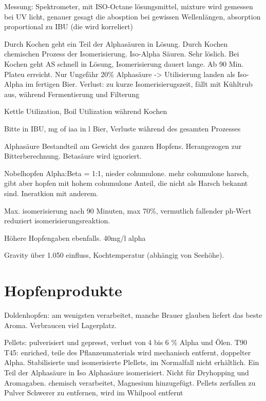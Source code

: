 \documentclass[a4paper,parskip=half]{scrartcl}
\begin{document}
Messung: Spektrometer, mit ISO-Octane lösungsmittel, mixture
wird gemessen bei UV licht, genauer gesagt die abosption
bei gewissen Wellenlängen, absorption proportional
zu IBU (die wird korreliert)

\parencite[12]{Garetz1994}
Durch Kochen geht ein Teil der Alphasäuren in Lösung. Durch Kochen
chemischen Prozess der Isomerisierung. Iso-Alpha Säuren. Sehr löslich.
Bei Kochen geht AS schnell in Lösung, Isomerisierung dauert lange.
Ab 90 Min. Plateu erreicht.
Nur Ungefähr 20\% Alphasäure -> Utilisierung landen als Iso-Alpha im
fertigen Bier.
Verlust: zu kurze Isomerisierugszeit, fällt mit Kühltrub aus,
während Fermentierung und Filterung

\parencite[13]{Garetz1994}
Kettle Utilization, Boil Utilization während Kochen

\parencite[14]{Garetz1994} 
Bitte in IBU, mg of iaa in l Bier, Verluste während des gesamten
Prozesses

\parencite[34]{Garetz1994}
Alphasäure Bestandteil am Gewicht des ganzen Hopfens. Herangezogen
zur Bitterberechnung. Betasäure wird ignoriert.

\parencite[35]{Garetz1994}
Nobelhopfen Alpha:Beta = 1:1, nieder cohumulone.
mehr cohumulone harsch, gibt aber hopfen mit hohem cohumulone
Anteil, die nicht als Harsch bekannt sind. Ineratkion
mit anderem.

\parencite[128]{Garetz1994} 
Max. isomerisierung nach 90 Minuten, max 70\%, vermutlich fallender
ph-Wert reduziert isomerisierungsreaktion.

Höhere Hopfengaben ebenfalls. 40mg/l alpha 

\parencite[129]{Garetz1994} 
Gravity über 1.050 einfluss, Kochtemperatur (abhängig von Seehöhe).



\section{Hopfenprodukte}



\parencite[80\psq]{Garetz1994}
Doldenhopfen: am wenigsten verarbeitet, manche Brauer glauben
liefert das beste Aroma. Verbraucen viel Lagerplatz.

\parencite[82\psqq]{Garetz1994}
Pellets: pulverisiert und gepresst, verlust von 4 bis 6 \% Alpha
und Ölen.
T90
T45: enriched, teile des Pflanzenmaterials wird mechanisch
entfernt, doppelter Alpha.
Stabilisierte und isomerisierte Plellets, im Normalfall nicht
erhältlich. Ein Teil der Alphasäure in Iso Alphasäure
isomerisiert. Nicht für Dryhopping und Aromagaben.
chemisch verarbeitet, Magnesium hinzugefügt.
Pellets zerfallen zu Pulver
Schwerer zu entfernen, wird im Whilpool entfernt \parencite[87]{Garetz1994}
\end{document}

